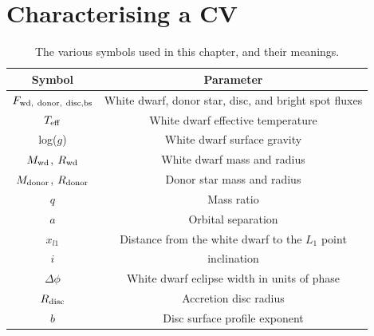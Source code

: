 \newpage
\section{Characterising a CV}
\label{sect:modelling:lightcurve modelling}

\begin{table}
    \centering
    \caption{The various symbols used in this chapter, and their meanings.}
    \label{table:modelling:parameter key}
    \begin{tabular}{cc}
        \hline
        Symbol & Parameter \\
        \hline
        \hline
        $F_{\rm wd,\ donor,\ disc, bs}$                                 & White dwarf, donor star, disc, and bright spot fluxes   \\
        $T_{\rm eff}$                                                   & White dwarf effective temperature \\
        log($g$)                                                        & White dwarf surface gravity \\
        $M_{\rm wd}$, $R_{\rm wd}$                                      & White dwarf mass and radius                             \\
        $M_{\rm donor}$, $R_{\rm donor}$                                & Donor star mass and radius                              \\
        $q$                                                             & Mass ratio                                              \\
        $a$                                                             & Orbital separation                                      \\
        $x_{l1}$                                                        & Distance from the white dwarf to the $L_1$ point        \\
        $i$                                                             & inclination                                             \\
        $\Delta \phi$                                                   & White dwarf eclipse width in units of phase             \\
        $R_{\rm disc}$                                                  & Accretion disc radius                                   \\
        $b$                                                             & Disc surface profile exponent                           \\

\end{tabular}
\end{table}
